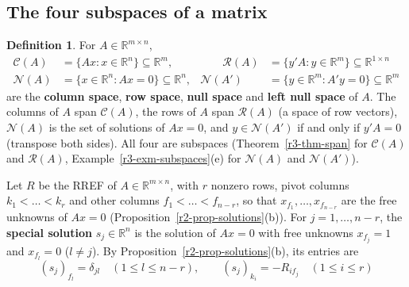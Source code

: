 \documentclass[12pt]{article}
\newcommand{\R}{\mathbb R}
\theoremstyle{definition}
\newtheorem{definition}[theorem]{Definition}
\begin{document}
\subsection*{The four subspaces of a matrix}

\begin{definition}\label{def:r4-spaces}
For \(A\in\R^{m\times n}\),
\[
\begin{aligned}
\mathcal C(A)&=\{Ax:x\in\R^n\}\subseteq\R^m, &\qquad
\mathcal R(A)&=\{y'A:y\in\R^m\}\subseteq\R^{1\times n}\\
\mathcal N(A)&=\{x\in\R^n:Ax=0\}\subseteq\R^n, &
\mathcal N(A')&=\{y\in\R^m:A'y=0\}\subseteq\R^m
\end{aligned}
\]
are the \textbf{column space}, \textbf{row space}, \textbf{null space} and \textbf{left null space}
of \(A\). The columns of \(A\) span \(\mathcal C(A)\), the rows of \(A\) span \(\mathcal R(A)\) (a
space of row vectors), \(\mathcal N(A)\) is the set of solutions of \(Ax=0\), and
\(y\in\mathcal N(A')\) if and only if \(y'A=0\) (transpose both sides). All four are subspaces
(Theorem~\ref{r3-thm-span} for \(\mathcal C(A)\) and \(\mathcal R(A)\), Example~\ref{r3-exm-subspaces}(e) for
\(\mathcal N(A)\) and \(\mathcal N(A')\)).
\end{definition}

Let \(R\) be the RREF of \(A\in\R^{m\times n}\), with \(r\) nonzero rows, pivot columns
\(k_1<\dots<k_r\) and other columns \(f_1<\dots<f_{n-r}\), so that \(x_{f_1},\dots,x_{f_{n-r}}\) are
the free unknowns of \(Ax=0\) (Proposition~\ref{r2-prop-solutions}(b)).
For \(j=1,\dots,n-r\), the \textbf{special solution} \(s_j\in\R^n\) is the solution of \(Ax=0\)
with free unknowns \(x_{f_j}=1\) and \(x_{f_l}=0\) (\(l\ne j\)). By
Proposition~\ref{r2-prop-solutions}(b), its entries are
\[
(s_j)_{f_l}=\delta_{jl}\quad(1\leqslant l\leqslant n-r),\qquad
(s_j)_{k_i}=-R_{if_j}\quad(1\leqslant i\leqslant r)
\]
\end{document}
